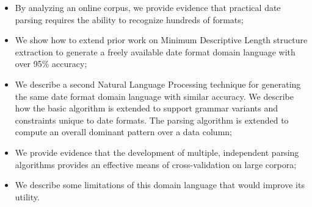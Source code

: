 \begin{itemize}
\setlength\itemsep{0em}
\item By analyzing an online corpus, we provide evidence that practical date parsing requires the ability to recognize hundreds of formats;
\item We show how to extend prior work on Minimum Descriptive Length structure extraction to generate a freely available date format domain language with over 95\% accuracy;
\item We describe a second Natural Language Processing technique for generating the same date format domain language with similar accuracy. We describe how the basic algorithm is extended to support grammar variants and constraints unique to date formats. The parsing algorithm is extended to compute an overall dominant pattern over a data column;
\item We provide evidence that the development of multiple, independent parsing algorithms provides an effective means of cross-validation on large corpora;
\item We describe some limitations of this domain language that would improve its utility.
\end{itemize}
